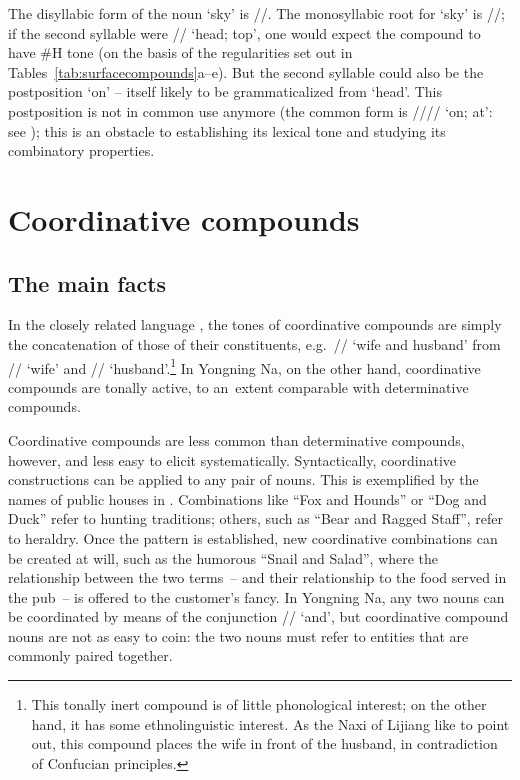 The disyllabic form of the noun ‘sky’ is //. The monosyllabic root for ‘sky’ is
//; if the second syllable were // ‘head; top’, one would expect the compound to
have \#H tone (on the basis of the regularities set out in Tables~\ref{tab:surfacecompounds}a--e). But the second
syllable could also be the postposition ‘on’ – itself likely to be grammaticalized from ‘head’. This postposition is not in common use anymore (the common form is //// ‘on; at’: see ); this is an obstacle to establishing its lexical tone and studying its combinatory properties.


\section{Coordinative compounds}
\label{sec:coordinativecompounds}

\subsection{The main facts}
\label{sec:themainfactscoordinativecompounds}

In the closely related language , the tones of coordinative compounds are simply the
concatenation of those of their constituents, e.g.~// ‘wife and husband’ from // ‘wife’ and // ‘husband’.\footnote{This tonally inert compound is of little phonological interest; on the other hand, it has some ethnolinguistic interest. As the {Naxi} of Lijiang like to point out, this compound places the wife in front of the
husband, in contradiction of Confucian principles.} In Yongning Na, on the other hand, coordinative compounds are tonally active, to an~extent
comparable with determinative compounds.

Coordinative compounds are less common than determinative compounds, however, and less easy to
elicit systematically. Syntactically, coordinative constructions can be applied to any pair of nouns. This is exemplified by the names of public houses in . Combinations like “Fox and Hounds” or “Dog and Duck” refer to hunting traditions; others, such as “Bear and
Ragged Staff”, refer to heraldry. Once the pattern is established, new coordinative combinations can be created at will, such as the humorous “Snail and
Salad”, where the relationship between the two terms~-- and their relationship to the food served in
the pub~-- is offered to the customer’s fancy. In Yongning Na, any two nouns can be coordinated by
means of the conjunction // ‘and’, but coordinative compound nouns are not as easy to coin: the two nouns must refer to entities that are commonly paired together.

